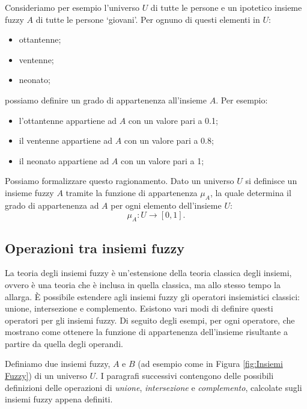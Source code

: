 \documentclass[a4paper,12pt]{report}
\begin{document}
Consideriamo per esempio l'universo $U$ di tutte le persone e un ipotetico insieme fuzzy $A$ di tutte le persone `giovani'. Per ognuno di questi elementi in $U$:
\begin{itemize}
    \item ottantenne;
    \item ventenne;
    \item neonato;
\end{itemize}
possiamo definire un grado di appartenenza all'insieme $A$. Per esempio:
\begin{itemize}
    \item l'ottantenne appartiene ad $A$ con un valore pari a 0.1;
    \item il ventenne appartiene ad $A$ con un valore pari a 0.8;
    \item il neonato appartiene ad $A$ con un valore pari a 1;
\end{itemize}
Possiamo formalizzare questo ragionamento.
Dato un universo $U$ si definisce un insieme fuzzy $A$ tramite la funzione di appartenenza $\mu_A$, la quale determina il grado di appartenenza ad $A$ per ogni elemento dell'insieme $U$:
\begin{equation*}
    \mu_A : U \to [0,1].
\end{equation*}

\subsection*{Operazioni tra insiemi fuzzy}
La teoria degli insiemi fuzzy è un'estensione della teoria classica degli insiemi, ovvero è una teoria che è inclusa in quella classica, ma allo stesso tempo la allarga.
\`E possibile estendere agli insiemi fuzzy gli operatori insiemistici classici: unione, intersezione e complemento. Esistono vari modi di definire questi operatori per gli insiemi fuzzy. 
Di seguito degli esempi, per ogni operatore, che mostrano come ottenere la funzione di appartenenza dell'insieme risultante a partire da quella degli operandi.

\bigskip
Definiamo due insiemi fuzzy, $A$ e $B$ (ad esempio come in Figura \ref{fig:Insiemi Fuzzy}) di un universo $U$. I paragrafi successivi contengono delle possibili definizioni delle operazioni di \textit{unione}, \textit{intersezione} e \textit{complemento}, calcolate sugli insiemi fuzzy appena definiti.
\end{document}
